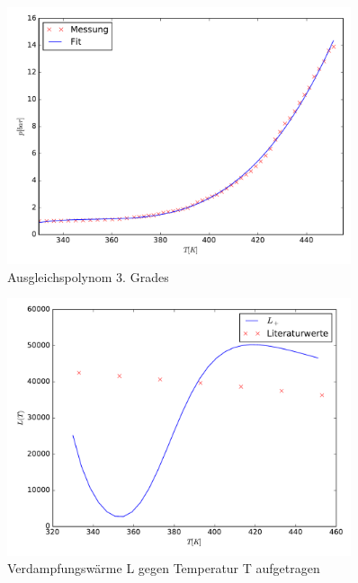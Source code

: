 



\begin{figure}
	\centering
	\includegraphics[width=0.9\textwidth]{Messung2.pdf}
	\caption{Ausgleichspolynom 3. Grades}
\end{figure}

\begin{figure}
	\centering
	\includegraphics[width=0.9\textwidth]{L+.pdf}
	\caption{Verdampfungswärme L gegen Temperatur T aufgetragen}
\end{figure}





